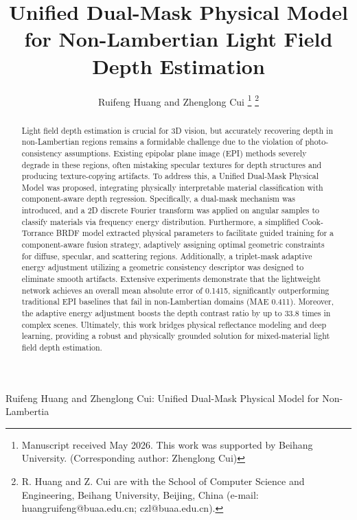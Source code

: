 \documentclass[lettersize,journal]{IEEEtran}
\begin{document}
\title{Unified Dual-Mask Physical Model for Non-Lambertian Light Field Depth Estimation}

\author{Ruifeng Huang and Zhenglong Cui
\thanks{Manuscript received May 2026. This work was supported by Beihang University. (Corresponding author: Zhenglong Cui)}
\thanks{R. Huang and Z. Cui are with the School of Computer Science and Engineering, Beihang University, Beijing, China (e-mail: huangruifeng@buaa.edu.cn; czl@buaa.edu.cn).}}

%
{Ruifeng Huang and Zhenglong Cui: Unified Dual-Mask Physical Model for Non-Lambertia}

\maketitle

\begin{abstract}
Light field depth estimation is crucial for 3D vision, but accurately recovering depth in non-Lambertian regions remains a formidable challenge due to the violation of photo-consistency assumptions. Existing epipolar plane image (EPI) methods severely degrade in these regions, often mistaking specular textures for depth structures and producing texture-copying artifacts. To address this, a Unified Dual-Mask Physical Model was proposed, integrating physically interpretable material classification with component-aware depth regression. Specifically, a dual-mask mechanism was introduced, and a 2D discrete Fourier transform was applied on angular samples to classify materials via frequency energy distribution. Furthermore, a simplified Cook-Torrance BRDF model extracted physical parameters to facilitate guided training for a component-aware fusion strategy, adaptively assigning optimal geometric constraints for diffuse, specular, and scattering regions. Additionally, a triplet-mask adaptive energy adjustment utilizing a geometric consistency descriptor was designed to eliminate smooth artifacts. Extensive experiments demonstrate that the lightweight network achieves an overall mean absolute error of 0.1415, significantly outperforming traditional EPI baselines that fail in non-Lambertian domains (MAE 0.411). Moreover, the adaptive energy adjustment boosts the depth contrast ratio by up to 33.8 times in complex scenes. Ultimately, this work bridges physical reflectance modeling and deep learning, providing a robust and physically grounded solution for mixed-material light field depth estimation.
\end{abstract}
\end{document}
